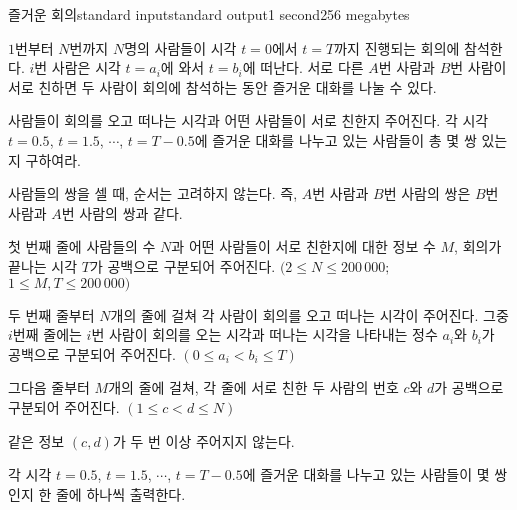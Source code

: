 \begin{problem}{즐거운 회의}{standard input}{standard output}{1 second}{256 megabytes}

$1$번부터 $N$번까지 $N$명의 사람들이 시각 $t=0$에서 $t=T$까지 진행되는 회의에 참석한다. $i$번 사람은 시각 $t=a_i$에 와서 $t=b_i$에 떠난다. 서로 다른 $A$번 사람과 $B$번 사람이 서로 친하면 두 사람이 회의에 참석하는 동안 즐거운 대화를 나눌 수 있다.

사람들이 회의를 오고 떠나는 시각과 어떤 사람들이 서로 친한지 주어진다. 각 시각 $t=0.5$, $t=1.5$, $\cdots$, $t=T-0.5$에 즐거운 대화를 나누고 있는 사람들이 총 몇 쌍 있는지 구하여라.

사람들의 쌍을 셀 때, 순서는 고려하지 않는다. 즉, $A$번 사람과 $B$번 사람의 쌍은 $B$번 사람과 $A$번 사람의 쌍과 같다.

\InputFile
첫 번째 줄에 사람들의 수 $N$과 어떤 사람들이 서로 친한지에 대한 정보 수 $M$, 회의가 끝나는 시각 $T$가 공백으로 구분되어 주어진다. $(2 \le N \le 200\,000;$ $1 \le M, T \le 200\,000)$

두 번째 줄부터 $N$개의 줄에 걸쳐 각 사람이 회의를 오고 떠나는 시각이 주어진다. 그중 $i$번째 줄에는 $i$번 사람이 회의를 오는 시각과 떠나는 시각을 나타내는 정수 $a_i$와 $b_i$가 공백으로 구분되어 주어진다. $(0 \le a_i \lt b_i \le T)$

그다음 줄부터 $M$개의 줄에 걸쳐, 각 줄에 서로 친한 두 사람의 번호 $c$와 $d$가 공백으로 구분되어 주어진다. $(1 \le c \lt d \le N)$

같은 정보 $(c, d)$가 두 번 이상 주어지지 않는다.

\OutputFile
각 시각 $t=0.5$, $t=1.5$, $\cdots$, $t=T-0.5$에 즐거운 대화를 나누고 있는 사람들이 몇 쌍인지 한 줄에 하나씩 출력한다.

\Examples

\begin{example}
%
%
\end{example}

\end{problem}

